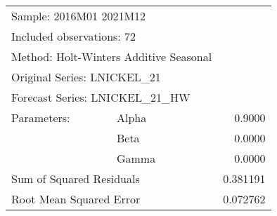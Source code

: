 \begin{tabular}{lrrrr}
\toprule
\multicolumn{3}{l}{Sample: 2016M01 2021M12}&\multicolumn{1}{c}{}&\multicolumn{1}{c}{}\\
\multicolumn{3}{l}{Included observations: 72}&\multicolumn{1}{c}{}&\multicolumn{1}{c}{}\\
\multicolumn{4}{l}{Method: Holt-Winters Additive Seasonal}&\multicolumn{1}{c}{}\\
\multicolumn{3}{l}{Original Series: LNICKEL\_21}&\multicolumn{1}{c}{}&\multicolumn{1}{c}{}\\
\multicolumn{4}{l}{Forecast Series: LNICKEL\_21\_HW}&\multicolumn{1}{c}{}\\
\midrule
\multicolumn{1}{l}{Parameters:}&\multicolumn{1}{l}{Alpha}&\multicolumn{1}{c}{}&\multicolumn{1}{c}{}&\multicolumn{1}{r}{0.9000}\\
\multicolumn{1}{c}{}&\multicolumn{1}{l}{Beta}&\multicolumn{1}{c}{}&\multicolumn{1}{c}{}&\multicolumn{1}{r}{0.0000}\\
\multicolumn{1}{c}{}&\multicolumn{1}{l}{Gamma}&\multicolumn{1}{c}{}&\multicolumn{1}{c}{}&\multicolumn{1}{r}{0.0000}\\
\multicolumn{3}{l}{Sum of Squared Residuals}&\multicolumn{1}{c}{}&\multicolumn{1}{r}{0.381191}\\
\multicolumn{3}{l}{Root Mean Squared Error}&\multicolumn{1}{c}{}&\multicolumn{1}{r}{0.072762}\\
\bottomrule
\end{tabular}